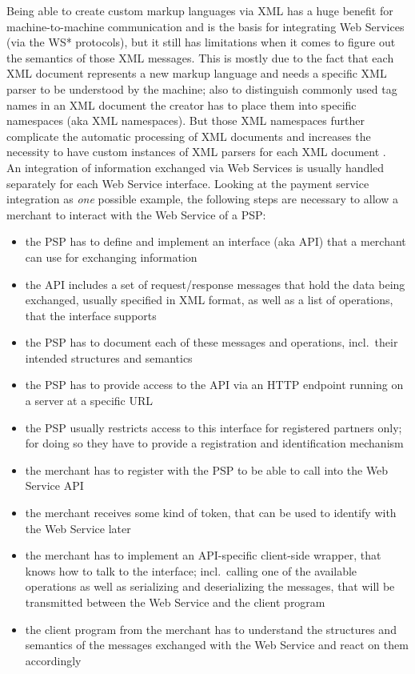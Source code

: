 Being able to create custom markup languages via \gls{XML} has a huge benefit for machine-to-machine communication and is the basis for integrating Web Services (via the WS* protocols), but it still has limitations when it comes to figure out the semantics of those \gls{XML} messages. This is mostly due to the fact that each \gls{XML} document represents a new markup language and needs a specific \gls{XML} parser to be understood by the machine; also to distinguish commonly used tag names in an \gls{XML} document the creator has to place them into specific namespaces (aka \gls{XML} namespaces). But those \gls{XML} namespaces further complicate the automatic processing of \gls{XML} documents and increases the necessity to have custom instances of \gls{XML} parsers for each \gls{XML} document \citep{taylor2008p2p}. \\

An integration of information exchanged via Web Services is usually handled separately for each Web Service interface. Looking at the payment service integration as \emph{one} possible example, the following steps are necessary to allow a merchant to interact with the Web Service of a \gls{PSP}: \@

\begin{itemize}
  \item the \gls{PSP} has to define and implement an interface (aka \gls{API}) that a merchant can use for exchanging information
  \item the \gls{API} includes a set of request/response messages that hold the data being exchanged, usually specified in \gls{XML} format, as well as a list of operations, that the interface supports
  \item the \gls{PSP} has to document each of these messages and operations, incl.\ their intended structures and semantics
  \item the \gls{PSP} has to provide access to the \gls{API} via an \gls{HTTP} endpoint running on a server at a specific \gls{URL}
  \item the \gls{PSP} usually restricts access to this interface for registered partners only; for doing so they have to provide a registration and identification mechanism
  \item the merchant has to register with the \gls{PSP} to be able to call into the Web Service \gls{API}
  \item the merchant receives some kind of token, that can be used to identify with the Web Service later
  \item the merchant has to implement an \gls{API}-specific client-side wrapper, that knows how to talk to the interface; incl.\ calling one of the available operations as well as serializing and deserializing the messages, that will be transmitted between the Web Service and the client program
  \item the client program from the merchant has to understand the structures and semantics of the messages exchanged with the Web Service and react on them accordingly
\end{itemize}

